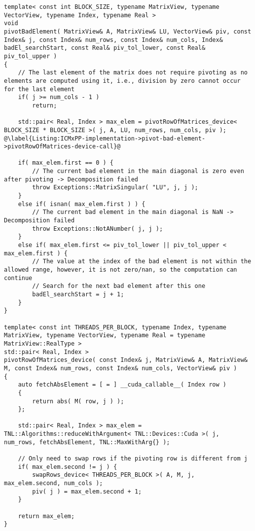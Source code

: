 \begin{lstlisting}[caption={The definition of the \code{pivotBadElement()} function which is responsible for pivoting a bad element found in column \code{j} of the main diagonal.
The \code{pivotRowOfMatrices\_device()} function, presented below the \code{pivotBadElement()} function, is implemented in the parent class of \code{IterativeCroutMethod}: \code{BaseDecomposer}.
Note that the variant of the \code{swapRows\_device()} function presented in the \code{pivotRowOfMatrices\_device()} swaps the rows in two matrices.},label={Listing:ICMxPP-implementation-pivot-bad-element},escapechar=@]
template< const int BLOCK_SIZE, typename MatrixView, typename VectorView, typename Index, typename Real >
void
pivotBadElement( MatrixView& A, MatrixView& LU, VectorView& piv, const Index& j, const Index& num_rows, const Index& num_cols, Index& badEl_searchStart, const Real& piv_tol_lower, const Real& piv_tol_upper )
{
	// The last element of the matrix does not require pivoting as no elements are computed using it, i.e., division by zero cannot occur for the last element
	if( j >= num_cols - 1 )
		return;
	
	std::pair< Real, Index > max_elem = pivotRowOfMatrices_device< BLOCK_SIZE * BLOCK_SIZE >( j, A, LU, num_rows, num_cols, piv ); @\label{Listing:ICMxPP-implementation->pivot-bad-element->pivotRowOfMatrices-device-call}@
	
	if( max_elem.first == 0 ) {
		// The current bad element in the main diagonal is zero even after pivoting -> Decomposition failed
		throw Exceptions::MatrixSingular( "LU", j, j );
	}
	else if( isnan( max_elem.first ) ) {
		// The current bad element in the main diagonal is NaN -> Decomposition failed
		throw Exceptions::NotANumber( j, j );
	}
	else if( max_elem.first <= piv_tol_lower || piv_tol_upper < max_elem.first ) {
		// The value at the index of the bad element is not within the allowed range, however, it is not zero/nan, so the computation can continue
		// Search for the next bad element after this one
		badEl_searchStart = j + 1;
	}
}

template< const int THREADS_PER_BLOCK, typename Index, typename MatrixView, typename VectorView, typename Real = typename MatrixView::RealType >
std::pair< Real, Index >
pivotRowOfMatrices_device( const Index& j, MatrixView& A, MatrixView& M, const Index& num_rows, const Index& num_cols, VectorView& piv )
{
	auto fetchAbsElement = [ = ] __cuda_callable__( Index row )
	{
		return abs( M( row, j ) );
	};
	
	std::pair< Real, Index > max_elem = TNL::Algorithms::reduceWithArgument< TNL::Devices::Cuda >( j, num_rows, fetchAbsElement, TNL::MaxWithArg{} );
	
	// Only need to swap rows if the pivoting row is different from j
	if( max_elem.second != j ) {
		swapRows_device< THREADS_PER_BLOCK >( A, M, j, max_elem.second, num_cols );
		piv( j ) = max_elem.second + 1;
	}
	
	return max_elem;
}
\end{lstlisting}

